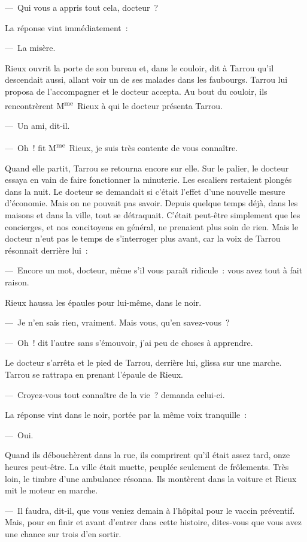 \documentclass[french,twoside]{book} %
\begin{document}
— Qui vous a appris tout cela, docteur ?\par
La réponse vint immédiatement :\par
— La misère.\par
Rieux ouvrit la porte de son bureau et, dans le couloir, dit à Tarrou qu’il descendait aussi, allant voir un de ses malades dans les faubourgs. Tarrou lui proposa de l’accompagner et le docteur accepta. Au bout du couloir, ils rencontrèrent M\textsuperscript{me} Rieux à qui le docteur présenta Tarrou.\par
— Un ami, dit-il.\par
— Oh ! fit M\textsuperscript{me} Rieux, je suis très contente de vous connaître.\par
Quand elle partit, Tarrou se retourna encore sur elle. Sur le palier, le docteur essaya en vain de faire fonctionner la minuterie. Les escaliers restaient plongés dans la nuit. Le docteur se demandait si c’était l’effet d’une nouvelle mesure d’économie. Mais on ne pouvait pas savoir. Depuis quelque temps déjà, dans les maisons et dans la ville, tout se détraquait. C’était peut-être simplement que les concierges, et nos concitoyens en général, ne prenaient plus soin de rien. Mais le docteur n’eut pas le temps de s’interroger plus avant, car la voix de Tarrou résonnait derrière lui :\par
— Encore un mot, docteur, même s’il vous paraît ridicule : vous avez tout à fait raison.\par
Rieux haussa les épaules pour lui-même, dans le noir.\par
— Je n’en sais rien, vraiment. Mais vous, qu’en savez-vous ?\par
— Oh ! dit l’autre sans s’émouvoir, j’ai peu de choses à apprendre.\par
Le docteur s’arrêta et le pied de Tarrou, derrière lui, glissa sur une marche. Tarrou se rattrapa en prenant l’épaule de Rieux.\par
— Croyez-vous tout connaître de la vie ? demanda celui-ci.\par
La réponse vint dans le noir, portée par la même voix tranquille :\par
— Oui.\par
Quand ils débouchèrent dans la rue, ils comprirent qu’il était assez tard, onze heures peut-être. La ville était muette, peuplée seulement de frôlements. Très loin, le timbre d’une ambulance résonna. Ils montèrent dans la voiture et Rieux mit le moteur en marche.\par
— Il faudra, dit-il, que vous veniez demain à l’hôpital pour le vaccin préventif. Mais, pour en finir et avant d’entrer dans cette histoire, dites-vous que vous avez une chance sur trois d’en sortir.\par
\end{document}
